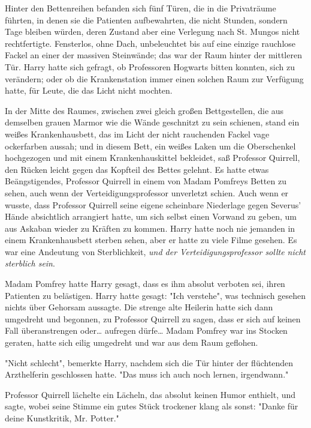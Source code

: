 {Hinter den Bettenreihen befanden sich fünf Türen, die in die Privaträume führten, in denen sie die Patienten aufbewahrten, die nicht Stunden, sondern Tage bleiben würden, deren Zustand aber eine Verlegung nach St. Mungos nicht rechtfertigte. Fensterlos, ohne Dach, unbeleuchtet bis auf eine einzige rauchlose Fackel an einer der massiven Steinwände; das war der Raum hinter der mittleren Tür. Harry hatte sich gefragt, ob Professoren Hogwarts bitten konnten, sich zu verändern; oder ob die Krankenstation immer einen solchen Raum zur Verfügung hatte, für Leute, die das Licht nicht mochten.

In der Mitte des Raumes, zwischen zwei gleich großen Bettgestellen, die aus demselben grauen Marmor wie die Wände geschnitzt zu sein schienen, stand ein weißes Krankenhausbett, das im Licht der nicht rauchenden Fackel vage ockerfarben aussah; und in diesem Bett, ein weißes Laken um die Oberschenkel hochgezogen und mit einem Krankenhauskittel bekleidet, saß Professor Quirrell, den Rücken leicht gegen das Kopfteil des Bettes gelehnt. Es hatte etwas Beängstigendes, Professor Quirrell in einem von Madam Pomfreys Betten zu sehen, auch wenn der Verteidigungsprofessor unverletzt schien. Auch wenn er wusste, dass Professor Quirrell seine eigene scheinbare Niederlage gegen Severus' Hände absichtlich arrangiert hatte, um sich selbst einen Vorwand zu geben, um aus Askaban wieder zu Kräften zu kommen. Harry hatte noch nie jemanden in einem Krankenhausbett sterben sehen, aber er hatte zu viele Filme gesehen. Es war eine Andeutung von Sterblichkeit, \emph{und der Verteidigungsprofessor sollte nicht sterblich sein}.

Madam Pomfrey hatte Harry gesagt, dass es ihm absolut verboten sei, ihren Patienten zu belästigen. Harry hatte gesagt: "Ich verstehe", was technisch gesehen nichts über Gehorsam aussagte. Die strenge alte Heilerin hatte sich dann umgedreht und begonnen, zu Professor Quirrell zu sagen, dass er sich auf keinen Fall überanstrengen oder… aufregen dürfe… Madam Pomfrey war ins Stocken geraten, hatte sich eilig umgedreht und war aus dem Raum geflohen.

"Nicht schlecht", bemerkte Harry, nachdem sich die Tür hinter der flüchtenden Arzthelferin geschlossen hatte. "Das muss ich auch noch lernen, irgendwann."

Professor Quirrell lächelte ein Lächeln, das absolut keinen Humor enthielt, und sagte, wobei seine Stimme ein gutes Stück trockener klang als sonst: "Danke für deine Kunstkritik, Mr. Potter."

}
